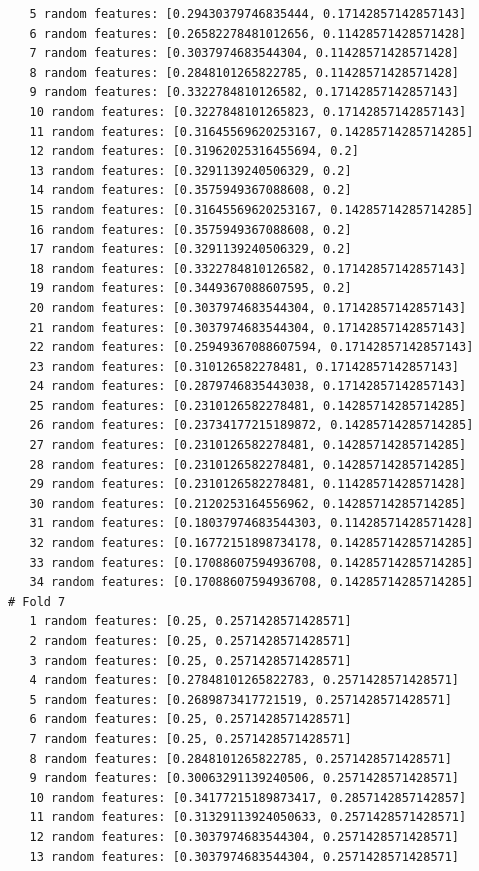 \documentclass[12pt]{amsart}
\begin{document}
\begin{verbatim}
   5 random features: [0.29430379746835444, 0.17142857142857143]
   6 random features: [0.26582278481012656, 0.11428571428571428]
   7 random features: [0.3037974683544304, 0.11428571428571428]
   8 random features: [0.2848101265822785, 0.11428571428571428]
   9 random features: [0.3322784810126582, 0.17142857142857143]
   10 random features: [0.3227848101265823, 0.17142857142857143]
   11 random features: [0.31645569620253167, 0.14285714285714285]
   12 random features: [0.31962025316455694, 0.2]
   13 random features: [0.3291139240506329, 0.2]
   14 random features: [0.3575949367088608, 0.2]
   15 random features: [0.31645569620253167, 0.14285714285714285]
   16 random features: [0.3575949367088608, 0.2]
   17 random features: [0.3291139240506329, 0.2]
   18 random features: [0.3322784810126582, 0.17142857142857143]
   19 random features: [0.3449367088607595, 0.2]
   20 random features: [0.3037974683544304, 0.17142857142857143]
   21 random features: [0.3037974683544304, 0.17142857142857143]
   22 random features: [0.25949367088607594, 0.17142857142857143]
   23 random features: [0.310126582278481, 0.17142857142857143]
   24 random features: [0.2879746835443038, 0.17142857142857143]
   25 random features: [0.2310126582278481, 0.14285714285714285]
   26 random features: [0.23734177215189872, 0.14285714285714285]
   27 random features: [0.2310126582278481, 0.14285714285714285]
   28 random features: [0.2310126582278481, 0.14285714285714285]
   29 random features: [0.2310126582278481, 0.11428571428571428]
   30 random features: [0.2120253164556962, 0.14285714285714285]
   31 random features: [0.18037974683544303, 0.11428571428571428]
   32 random features: [0.16772151898734178, 0.14285714285714285]
   33 random features: [0.17088607594936708, 0.14285714285714285]
   34 random features: [0.17088607594936708, 0.14285714285714285]
# Fold 7
   1 random features: [0.25, 0.2571428571428571]
   2 random features: [0.25, 0.2571428571428571]
   3 random features: [0.25, 0.2571428571428571]
   4 random features: [0.27848101265822783, 0.2571428571428571]
   5 random features: [0.2689873417721519, 0.2571428571428571]
   6 random features: [0.25, 0.2571428571428571]
   7 random features: [0.25, 0.2571428571428571]
   8 random features: [0.2848101265822785, 0.2571428571428571]
   9 random features: [0.30063291139240506, 0.2571428571428571]
   10 random features: [0.34177215189873417, 0.2857142857142857]
   11 random features: [0.31329113924050633, 0.2571428571428571]
   12 random features: [0.3037974683544304, 0.2571428571428571]
   13 random features: [0.3037974683544304, 0.2571428571428571]

\end{verbatim}
\end{document}
